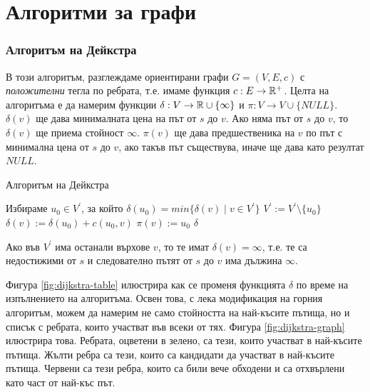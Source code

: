 \chapter {Алгоритми за графи}

\subsection{Алгоритъм на Дейкстра}

В този алгоритъм, разглеждаме ориентирани графи $G = (V,E,c)$ с {\em положителни} тегла по ребрата, т.е. 
имаме функция $c:E\to\mathbb{R}^+$. 
Целта на алгоритъма е да намерим функции $\delta: V\to\mathbb{R}\cup\{\infty\}$ и $\pi:V\to V\cup\{NULL\}$.
$\delta(v)$ ще дава минималната цена на път от $s$ до $v$. Ако няма път от $s$ до $v$, то $\delta(v)$
ще приема стойност $\infty$. $\pi(v)$ ще дава предшественика на $v$ по път с минимална цена от $s$ до $v$,
ако такъв път съществува, иначе ще дава като резултат $NULL$.

\begin{algorithm}
\caption{Алгоритъм на Дейкстра}
\label{alg:dijkstra}

\begin{algorithmic}[1]
  \STATE {}
  
  \STATE Избираме $u_0\in V^\prime$, за който $ \delta(u_0) = min\{\delta(v)\mid v\in V^\prime\} $
  \STATE $V^\prime := V^\prime\setminus\{u_0\}$
  \STATE $\delta(v):= \delta(u_0)+c(u_0,v)$
  \STATE $\pi(v) := u_0$
  \ENDIF
  \ENDFOR
  \ENDWHILE
  \RETURN $\delta$
\end{algorithmic}
\end{algorithm}

Ако във $V^\prime$ има останали върхове $v$, то те имат $\delta(v) = \infty$, т.е.
те са недостижими от $s$ и следователно пътят от $s$ до $v$ има дължина $\infty$.

Фигура \ref{fig:dijkstra-table} илюстрира как се променя функцията $\delta$ по време на изпълнението на алгоритъма.
Освен това, с лека модификация на горния алгоритъм, можем да намерим не само стойността на най-късите пътища, но
и списък с ребрата, които участват във всеки от тях. Фигура \ref{fig:dijkstra-graph} илюстрира това.
Ребрата, оцветени в зелено, са тези, които участват в най-късите пътища.
Жълти ребра са тези, които са кандидати да участват в най-късите пътища.
Червени са тези ребра, които са били вече обходени и са отхвърлени като част от най-къс път.

